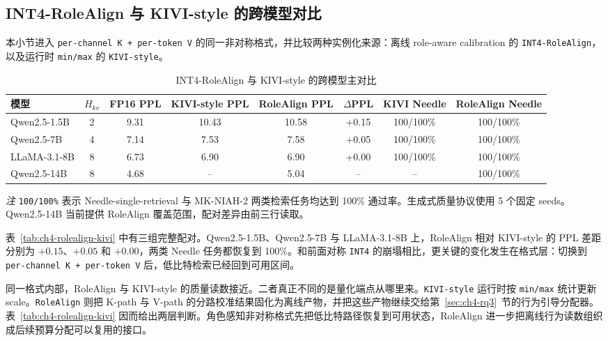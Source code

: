 \subsection{INT4-RoleAlign 与 KIVI-style 的跨模型对比}
\label{subsec:ch4-rolealign-kivi}
\label{subsec:exp-int4-cross-model}
\label{sec:exp-rolealign}

本小节进入 \texttt{per-channel K + per-token V} 的同一非对称格式，并比较两种实例化来源：离线 role-aware calibration 的 \texttt{INT4-RoleAlign}，以及运行时 \texttt{min/max} 的 \texttt{KIVI-style}。

\begin{table}[H]
  \centering
  \caption{INT4-RoleAlign 与 KIVI-style 的跨模型主对比}
  \label{tab:ch4-rolealign-kivi}
  \label{tab:t2-int4-kivi}
  {%
  \footnotesize
  \setlength{\tabcolsep}{4pt}
  \renewcommand{\arraystretch}{1.05}
  \begin{tabular}{lccccccc}
    \toprule
    模型 & $H_{kv}$ & FP16 PPL & KIVI-style PPL & RoleAlign PPL & $\Delta$PPL & KIVI Needle & RoleAlign Needle \\
    \midrule
    Qwen2.5-1.5B & 2 & 9.31 & 10.43 & 10.58 & +0.15 & 100/100\% & 100/100\% \\
    Qwen2.5-7B   & 4 & 7.14 & 7.53  & 7.58  & +0.05 & 100/100\% & 100/100\% \\
    LLaMA-3.1-8B & 8 & 6.73 & 6.90  & 6.90  & +0.00 & 100/100\% & 100/100\% \\
    Qwen2.5-14B  & 8 & 4.68 & --    & 5.04  & --    & --         & 100/100\% \\
    \bottomrule
  \end{tabular}

  \vspace{0.35em}
  \begin{minipage}{0.94\linewidth}
    \footnotesize
    \emph{注} \texttt{100/100\%} 表示 Needle-single-retrieval 与 MK-NIAH-2 两类检索任务均达到 100\% 通过率。生成式质量协议使用 5 个固定 seeds。Qwen2.5-14B 当前提供 RoleAlign 覆盖范围，配对差异由前三行读取。
  \end{minipage}
  }
\end{table}

表~\ref{tab:ch4-rolealign-kivi} 中有三组完整配对。Qwen2.5-1.5B、Qwen2.5-7B 与 LLaMA-3.1-8B 上，RoleAlign 相对 KIVI-style 的 PPL 差距分别为 $+0.15$、$+0.05$ 和 $+0.00$，两类 Needle 任务都恢复到 100\%。和前面对称 \texttt{INT4} 的崩塌相比，更关键的变化发生在格式层：切换到 \texttt{per-channel K + per-token V} 后，低比特检索已经回到可用区间。

同一格式内部，RoleAlign 与 KIVI-style 的质量读数接近。二者真正不同的是量化端点从哪里来。\texttt{KIVI-style} 运行时按 \texttt{min/max} 统计更新 scale。\texttt{RoleAlign} 则把 K-path 与 V-path 的分路校准结果固化为离线产物，并把这些产物继续交给第~\ref{sec:ch4-rq3}~节的行为引导分配器。表~\ref{tab:ch4-rolealign-kivi} 因而给出两层判断。角色感知非对称格式先把低比特路径恢复到可用状态，RoleAlign 进一步把离线行为读数组织成后续预算分配可以复用的接口。

